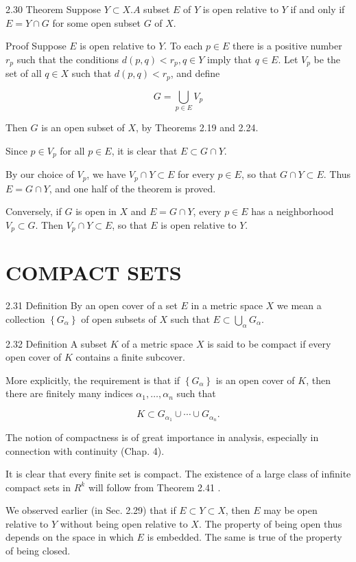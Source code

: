 \documentclass[10pt]{article}
\begin{document}
2.30 Theorem Suppose $Y \subset X . A$ subset $E$ of $Y$ is open relative to $Y$ if and only if $E=Y \cap G$ for some open subset $G$ of $X$.

Proof Suppose $E$ is open relative to $Y$. To each $p \in E$ there is a positive number $r_{p}$ such that the conditions $d(p, q)<r_{p}, q \in Y$ imply that $q \in E$. Let $V_{p}$ be the set of all $q \in X$ such that $d(p, q)<r_{p}$, and define

$$
G=\bigcup_{p \in E} V_{p}
$$

Then $G$ is an open subset of $X$, by Theorems 2.19 and 2.24.

Since $p \in V_{p}$ for all $p \in E$, it is clear that $E \subset G \cap Y$.

By our choice of $V_{p}$, we have $V_{p} \cap Y \subset E$ for every $p \in E$, so that $G \cap Y \subset E$. Thus $E=G \cap Y$, and one half of the theorem is proved.

Conversely, if $G$ is open in $X$ and $E=G \cap Y$, every $p \in E$ has a neighborhood $V_{p} \subset G$. Then $V_{p} \cap Y \subset E$, so that $E$ is open relative to $Y$.

\section{COMPACT SETS}
2.31 Definition By an open cover of a set $E$ in a metric space $X$ we mean a collection $\left\{G_{\alpha}\right\}$ of open subsets of $X$ such that $E \subset \bigcup_{\alpha} G_{\alpha}$.

2.32 Definition A subset $K$ of a metric space $X$ is said to be compact if every open cover of $K$ contains a finite subcover.

More explicitly, the requirement is that if $\left\{G_{\alpha}\right\}$ is an open cover of $K$, then there are finitely many indices $\alpha_{1}, \ldots, \alpha_{n}$ such that

$$
K \subset G_{\alpha_{1}} \cup \cdots \cup G_{\alpha_{n}} .
$$

The notion of compactness is of great importance in analysis, especially in connection with continuity (Chap. 4).

It is clear that every finite set is compact. The existence of a large class of infinite compact sets in $R^{k}$ will follow from Theorem 2.41 .

We observed earlier (in Sec. 2.29) that if $E \subset Y \subset X$, then $E$ may be open relative to $Y$ without being open relative to $X$. The property of being open thus depends on the space in which $E$ is embedded. The same is true of the property of being closed.
\end{document}
